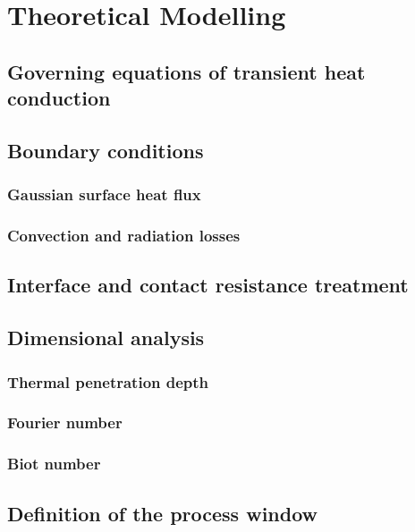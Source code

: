 \chapter{Theoretical Modelling}

\section{Governing equations of transient heat conduction}

\section{Boundary conditions}

\subsection{Gaussian surface heat flux}

\subsection{Convection and radiation losses}

\section{Interface and contact resistance treatment}

\section{Dimensional analysis}

\subsection{Thermal penetration depth}

\subsection{Fourier number}

\subsection{Biot number}

\section{Definition of the process window}
